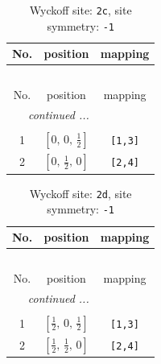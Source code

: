 \documentclass[fleqn,8pt]{jsarticle}
\begin{document}
\renewcommand{\arraystretch}{1.2}
\begin{longtable}{ccc}
\caption{Wyckoff site: {\tt 2c}, site symmetry: {\tt -1}}
 \\
 \hline \hline
No. & position & mapping \\ \hline \endfirsthead

\multicolumn{2}{l}{\tablename\ \thetable{}} \\
 \hline \hline
No. & position & mapping \\ \hline \endhead

 \hline \hline
\multicolumn{2}{r}{\footnotesize\it continued ...} \\ \endfoot

 \hline \hline
\multicolumn{2}{r}{} \\ \endlastfoot

1 & $\left[ 0,\, 0,\, \frac{1}{2} \right]$ & {\tt [1,3]} \\ \hline
2 & $\left[ 0,\, \frac{1}{2},\, 0 \right]$ & {\tt [2,4]} \\
\end{longtable}
\renewcommand{\arraystretch}{1.2}
\begin{longtable}{ccc}
\caption{Wyckoff site: {\tt 2d}, site symmetry: {\tt -1}}
 \\
 \hline \hline
No. & position & mapping \\ \hline \endfirsthead

\multicolumn{2}{l}{\tablename\ \thetable{}} \\
 \hline \hline
No. & position & mapping \\ \hline \endhead

 \hline \hline
\multicolumn{2}{r}{\footnotesize\it continued ...} \\ \endfoot

 \hline \hline
\multicolumn{2}{r}{} \\ \endlastfoot

1 & $\left[ \frac{1}{2},\, 0,\, \frac{1}{2} \right]$ & {\tt [1,3]} \\ \hline
2 & $\left[ \frac{1}{2},\, \frac{1}{2},\, 0 \right]$ & {\tt [2,4]} \\
\end{longtable}
\renewcommand{\arraystretch}{1.2}
\end{document}
